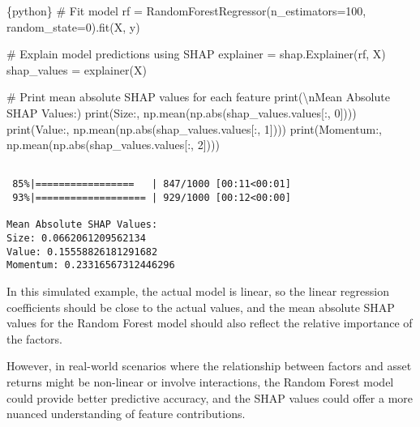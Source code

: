\documentclass[
  letterpaper,
  DIV=11,
  numbers=noendperiod]{scrartcl}
\newenvironment{Shaded}{\begin{snugshade}}{\end{snugshade}}
\newcommand{\BuiltInTok}[1]{\textcolor[rgb]{0.00,0.23,0.31}{#1}}
\newcommand{\CharTok}[1]{\textcolor[rgb]{0.13,0.47,0.30}{#1}}
\newcommand{\CommentTok}[1]{\textcolor[rgb]{0.37,0.37,0.37}{#1}}
\newcommand{\DecValTok}[1]{\textcolor[rgb]{0.68,0.00,0.00}{#1}}
\newcommand{\InformationTok}[1]{\textcolor[rgb]{0.37,0.37,0.37}{#1}}
\newcommand{\NormalTok}[1]{\textcolor[rgb]{0.00,0.23,0.31}{#1}}
\newcommand{\OperatorTok}[1]{\textcolor[rgb]{0.37,0.37,0.37}{#1}}
\newcommand{\StringTok}[1]{\textcolor[rgb]{0.13,0.47,0.30}{#1}}
\begin{document}
\begin{Shaded}
\begin{Highlighting}[]
\InformationTok{\textasciigrave{}\textasciigrave{}\textasciigrave{}\{python\}}
\CommentTok{\# Fit model}
\NormalTok{rf }\OperatorTok{=}\NormalTok{ RandomForestRegressor(n\_estimators}\OperatorTok{=}\DecValTok{100}\NormalTok{, random\_state}\OperatorTok{=}\DecValTok{0}\NormalTok{).fit(X, y)}

\CommentTok{\# Explain model predictions using SHAP}
\NormalTok{explainer }\OperatorTok{=}\NormalTok{ shap.Explainer(rf, X)}
\NormalTok{shap\_values }\OperatorTok{=}\NormalTok{ explainer(X)}

\CommentTok{\# Print mean absolute SHAP values for each feature}
\BuiltInTok{print}\NormalTok{(}\StringTok{\textquotesingle{}}\CharTok{\textbackslash{}n}\StringTok{Mean Absolute SHAP Values:\textquotesingle{}}\NormalTok{)}
\BuiltInTok{print}\NormalTok{(}\StringTok{\textquotesingle{}Size:\textquotesingle{}}\NormalTok{, np.mean(np.}\BuiltInTok{abs}\NormalTok{(shap\_values.values[:, }\DecValTok{0}\NormalTok{])))}
\BuiltInTok{print}\NormalTok{(}\StringTok{\textquotesingle{}Value:\textquotesingle{}}\NormalTok{, np.mean(np.}\BuiltInTok{abs}\NormalTok{(shap\_values.values[:, }\DecValTok{1}\NormalTok{])))}
\BuiltInTok{print}\NormalTok{(}\StringTok{\textquotesingle{}Momentum:\textquotesingle{}}\NormalTok{, np.mean(np.}\BuiltInTok{abs}\NormalTok{(shap\_values.values[:, }\DecValTok{2}\NormalTok{])))}
\InformationTok{\textasciigrave{}\textasciigrave{}\textasciigrave{}}
\end{Highlighting}
\end{Shaded}

\begin{verbatim}

 85%|=================   | 847/1000 [00:11<00:01]       
 93%|=================== | 929/1000 [00:12<00:00]       

Mean Absolute SHAP Values:
Size: 0.0662061209562134
Value: 0.15558826181291682
Momentum: 0.23316567312446296
\end{verbatim}

In this simulated example, the actual model is linear, so the linear
regression coefficients should be close to the actual values, and the
mean absolute SHAP values for the Random Forest model should also
reflect the relative importance of the factors.

However, in real-world scenarios where the relationship between factors
and asset returns might be non-linear or involve interactions, the
Random Forest model could provide better predictive accuracy, and the
SHAP values could offer a more nuanced understanding of feature
contributions.
\end{document}
